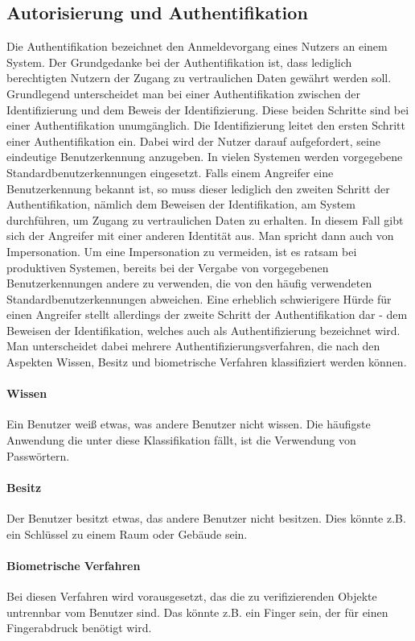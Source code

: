 \subsection{Autorisierung und Authentifikation}
\begin{k}
Die Authentifikation bezeichnet den Anmeldevorgang eines Nutzers an einem
System. Der Grundgedanke bei der Authentifikation ist, dass lediglich
berechtigten Nutzern der Zugang zu vertraulichen Daten gewährt werden soll.
Grundlegend unterscheidet man bei einer Authentifikation zwischen der
Identifizierung und dem Beweis der Identifizierung. Diese beiden Schritte sind
bei einer Authentifikation unumgänglich. Die Identifizierung leitet den ersten
Schritt einer Authentifikation ein. Dabei wird der Nutzer darauf aufgefordert,
seine eindeutige Benutzerkennung anzugeben. In vielen Systemen werden
vorgegebene Standardbenutzerkennungen eingesetzt. Falls einem Angreifer eine
Benutzerkennung bekannt ist, so muss dieser lediglich den zweiten Schritt der
Authentifikation, nämlich dem Beweisen der Identifikation, am System
durchführen, um Zugang zu vertraulichen Daten zu erhalten. In diesem Fall gibt
sich der Angreifer mit einer anderen Identität aus. Man spricht dann auch von
Impersonation. Um eine Impersonation zu vermeiden, ist es ratsam bei produktiven
Systemen, bereits bei der Vergabe von vorgegebenen Benutzerkennungen andere zu
verwenden, die von den häufig verwendeten Standardbenutzerkennungen abweichen.
Eine erheblich schwierigere Hürde für einen Angreifer stellt allerdings der
zweite Schritt der Authentifikation dar - dem Beweisen der Identifikation,
welches auch als Authentifizierung bezeichnet wird.
Man unterscheidet dabei mehrere Authentifizierungsverfahren, die nach den
Aspekten Wissen, Besitz und biometrische Verfahren klassifiziert werden können.

\paragraph{Wissen}
Ein Benutzer weiß etwas, was andere Benutzer nicht wissen. Die häufigste
Anwendung die unter diese Klassifikation fällt, ist die Verwendung von
Passwörtern.

\paragraph{Besitz}
Der Benutzer besitzt etwas, das andere Benutzer nicht besitzen. Dies könnte z.B.
ein Schlüssel zu einem Raum oder Gebäude sein.

\paragraph{Biometrische Verfahren}
Bei diesen Verfahren wird vorausgesetzt, das die zu verifizierenden Objekte
untrennbar vom Benutzer sind. Das könnte z.B. ein Finger sein, der für einen
Fingerabdruck benötigt wird.


\end{k}
